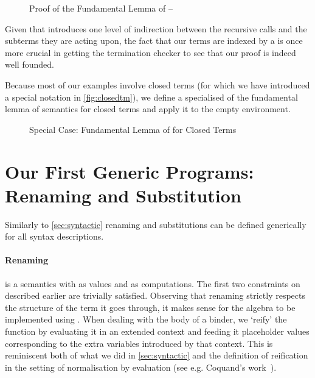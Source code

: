 \begin{figure}[h]
\caption{Proof of the Fundamental Lemma of  -- \label{fig:genbody}}
\end{figure}

Given that  introduces one level of indirection between the recursive
calls and the subterms they are acting upon, the fact that our terms are indexed
by a  is once more crucial in getting the termination checker to see
that our proof is indeed well founded.


Because most of our examples involve closed terms (for which we have introduced a special
notation in \cref{fig:closedtm}), we define a specialised of the fundamental lemma of semantics
for closed terms and apply it to the empty environment.

\begin{figure}[h]
\caption{Special Case: Fundamental Lemma of  for Closed Terms\label{fig:closedsem}}
\end{figure}


\section{Our First Generic Programs: Renaming and Substitution}\label{section:renandsub}

Similarly to \cref{sec:syntactic} renaming and substitutions can be defined generically
for all syntax descriptions.

\paragraph{Renaming} is a semantics with  as values and  as computations.
The first two constraints on  described earlier are trivially satisfied. Observing
that renaming strictly respects the structure of the term it goes through, it makes
sense for the algebra to be implemented using . When dealing with the body
of a binder, we `reify' the  function by evaluating it in an extended
context and feeding it placeholder values corresponding to the extra variables
introduced by that context. This is reminiscent both of what we did in
\cref{sec:syntactic} and the definition of reification in the setting of normalisation
by evaluation (see e.g. Coquand's work~\citeyear{coquand2002formalised}).

